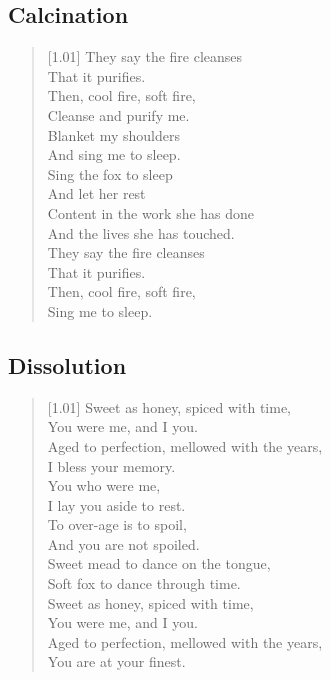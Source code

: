 \subsection{Calcination}

\begin{verse}[1.01\textwidth]
They say the fire cleanses\\
\vin That it purifies.\\
Then, cool fire, soft fire,\\
\vin Cleanse and purify me.\\
Blanket my shoulders\\
\vin And sing me to sleep.\\
Sing the fox to sleep\\
\vin And let her rest\\
Content in the work she has done\\
\vin And the lives she has touched.\\
They say the fire cleanses\\
\vin That it purifies.\\
Then, cool fire, soft fire,\\
\vin Sing me to sleep.\\
\end{verse}
\newpage

\subsection{Dissolution}

\begin{verse}[1.01\textwidth]
Sweet as honey, spiced with time,\\
\vin You were me, and I you.\\
Aged to perfection, mellowed with the years,\\
\vin I bless your memory.\\
You who were me,\\
\vin I lay you aside to rest.\\
To over-age is to spoil,\\
\vin And you are not spoiled.\\
Sweet mead to dance on the tongue,\\
\vin Soft fox to dance through time.\\
Sweet as honey, spiced with time,\\
\vin You were me, and I you.\\
Aged to perfection, mellowed with the years,\\
\vin You are at your finest.\\
\end{verse}
\newpage

